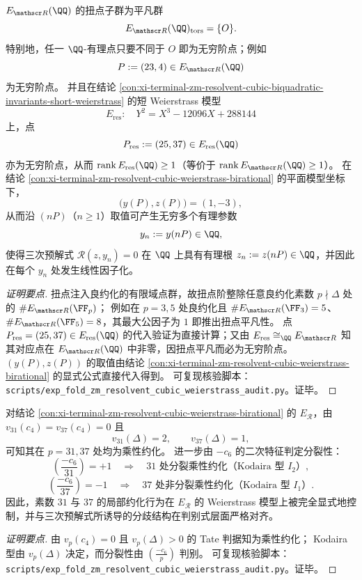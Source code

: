 \begin{conclusion}\label{con:xi-terminal-zm-resolvent-cubic-mw-point}
\(E_{\mathscr R}(\QQ)\) 的扭点子群为平凡群
\[
E_{\mathscr R}(\QQ)_{\mathrm{tors}}=\{O\}.
\]
特别地，任一 \(\QQ\)-有理点只要不同于 \(O\) 即为无穷阶点；例如
\[
P:=(23,4)\in E_{\mathscr R}(\QQ)
\]
为无穷阶点。
并且在结论 \ref{con:xi-terminal-zm-resolvent-cubic-biquadratic-invariants-short-weierstrass} 的短 Weierstrass 模型
\[
E_{\mathrm{res}}:\quad Y^2=X^3-12096X+288144
\]
上，点
\[
P_{\mathrm{res}}:=(25,37)\in E_{\mathrm{res}}(\QQ)
\]
亦为无穷阶点，从而 \(\operatorname{rank}E_{\mathrm{res}}(\QQ)\ge 1\)（等价于 \(\operatorname{rank}E_{\mathscr R}(\QQ)\ge 1\)）。
在结论 \ref{con:xi-terminal-zm-resolvent-cubic-weierstrass-birational} 的平面模型坐标下，
\[
\bigl(y(P),z(P)\bigr)=(1,-3),
\]
从而沿 \((nP)\)（\(n\ge 1\)）取值可产生无穷多个有理参数
\[
y_n:=y(nP)\in\QQ,
\]
使得三次预解式 \(\mathscr R(z,y_n)=0\) 在 \(\QQ\) 上具有有理根 \(z_n:=z(nP)\in\QQ\)，并因此在每个 \(y_n\) 处发生线性因子化。
\end{conclusion}
\begin{proof}[证明要点]
扭点注入良约化的有限域点群，故扭点阶整除任意良约化素数 \(p\nmid \Delta\) 处的 \(\#E_{\mathscr R}(\FF_p)\)；
例如在 \(p=3,5\) 处良约化且 \(\#E_{\mathscr R}(\FF_3)=5\)、\(\#E_{\mathscr R}(\FF_5)=8\)，其最大公因子为 \(1\) 即推出扭点平凡性。
点 \(P_{\mathrm{res}}=(25,37)\in E_{\mathrm{res}}(\QQ)\) 的代入验证为直接计算；又由 \(E_{\mathrm{res}}\cong_{\QQ}E_{\mathscr R}\) 知其对应点在 \(E_{\mathscr R}(\QQ)\) 中非零，因扭点平凡而必为无穷阶点。
\((y(P),z(P))\) 的取值由结论 \ref{con:xi-terminal-zm-resolvent-cubic-weierstrass-birational} 的显式公式直接代入得到。
可复现核验脚本：\texttt{scripts/exp\_fold\_zm\_resolvent\_cubic\_weierstrass\_audit.py}。证毕。
\end{proof}



\begin{conclusion}\label{con:xi-terminal-zm-resolvent-cubic-reduction-31-37}
对结论 \ref{con:xi-terminal-zm-resolvent-cubic-weierstrass-birational} 的 \(E_{\mathscr R}\)，由
\(
v_{31}(c_4)=v_{37}(c_4)=0
\)
且
\[
v_{31}(\Delta)=2,\qquad v_{37}(\Delta)=1,
\]
可知其在 \(p=31,37\) 处均为乘性约化。
进一步由 \(-c_6\) 的二次特征判定分裂性：
\[
\left(\frac{-c_6}{31}\right)=+1
\quad\Longrightarrow\quad
\text{\(31\) 处分裂乘性约化（Kodaira 型 \(I_2\)）},
\]
\[
\left(\frac{-c_6}{37}\right)=-1
\quad\Longrightarrow\quad
\text{\(37\) 处非分裂乘性约化（Kodaira 型 \(I_1\)）}.
\]
因此，素数 \(31\) 与 \(37\) 的局部约化行为在 \(E_{\mathscr R}\) 的 Weierstrass 模型上被完全显式地控制，并与三次预解式所诱导的分歧结构在判别式层面严格对齐。
\end{conclusion}
\begin{proof}[证明要点]
由 \(v_p(c_4)=0\) 且 \(v_p(\Delta)>0\) 的 Tate 判据知为乘性约化；
Kodaira 型由 \(v_p(\Delta)\) 决定，而分裂性由 \(\left(\frac{-c_6}{p}\right)\) 判别。
可复现核验脚本：\texttt{scripts/exp\_fold\_zm\_resolvent\_cubic\_weierstrass\_audit.py}。证毕。
\end{proof}

